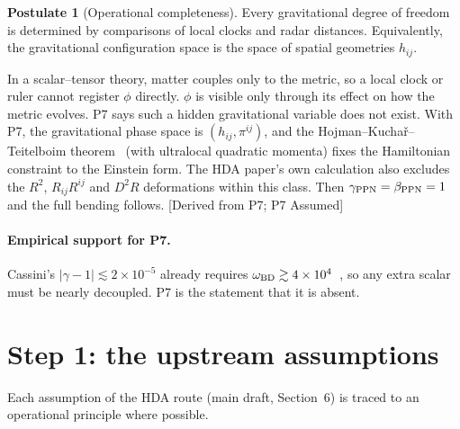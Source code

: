 \documentclass[11pt]{article}
\newcommand{\st}[1]{\textsf{\small[#1]}}
\theoremstyle{plain}
\theoremstyle{definition}
\newtheorem{postulate}{Postulate}
\theoremstyle{remark}
\begin{document}
\begin{postulate}[Operational completeness]\label{P:OC}
Every gravitational degree of freedom is determined by comparisons of local clocks and radar distances. Equivalently, the gravitational configuration space is the space of spatial geometries $h_{ij}$.
\end{postulate}

In a scalar--tensor theory, matter couples only to the metric, so a local clock or ruler cannot register $\phi$ directly. $\phi$ is visible only through its effect on how the metric evolves. P7 says such a hidden gravitational variable does not exist. With P7, the gravitational phase space is $(h_{ij},\pi^{ij})$, and the Hojman--Kucha\v{r}--Teitelboim theorem~\cite{HKT1976} (with ultralocal quadratic momenta) fixes the Hamiltonian constraint to the Einstein form. The HDA paper's own calculation also excludes the $R^2$, $R_{ij}R^{ij}$ and $D^2R$ deformations within this class. Then $\gamma_{\rm PPN}=\beta_{\rm PPN}=1$ and the full bending follows. \st{Derived from P7; P7 Assumed}

\paragraph{Empirical support for P7.} Cassini's $|\gamma-1|\lesssim2\times10^{-5}$ already requires $\omega_{\rm BD}\gtrsim4\times10^{4}$~\cite{Bertotti2003,Will2014}, so any extra scalar must be nearly decoupled. P7 is the statement that it is absent.

\section{Step 1: the upstream assumptions}
\label{sec:upstream}

Each assumption of the HDA route (main draft, Section~6) is traced to an operational principle where possible.
\end{document}
